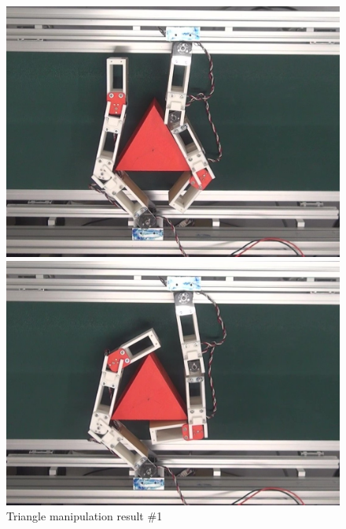 \documentclass[a4paper,papersize,dvipdfmx]{mtabst}
\begin{document}
\begin{figure}[t]
\begin{minipage}{0.249\linewidth}
\end{minipage}\hfill
\begin{minipage}{0.249\linewidth}
\centering
\includegraphics[width=0.9\linewidth]{fig/4-manipulation-result/Triangle/1-3.jpg}
\end{minipage}\hfill
\begin{minipage}{0.249\linewidth}
\centering
\includegraphics[width=0.9\linewidth]{fig/4-manipulation-result/Triangle/1-4.jpg}
\end{minipage}
\caption{Triangle manipulation result \#1}\label{fig::trim1}


\end{figure}
\end{document}

